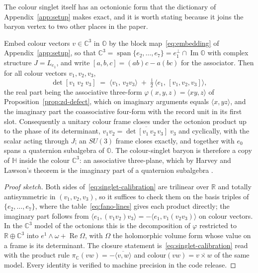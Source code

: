 The colour singlet itself has an octonionic form that the dictionary of Appendix~\ref{app:setup}
makes exact, and it is worth stating because it joins the baryon vertex to two other places in the
paper.

\begin{proposition}\label{prop:singlet-quaternion}
Embed colour vectors $v\in\mathbb{C}^3$ in $\mathbb{O}$ by the block map~\eqref{eq:embedding} of
Appendix~\ref{app:setup}, so that $\mathbb{C}^3 = \operatorname{span}\{e_2,\dots,e_7\} = e_1^{\perp}
\cap \operatorname{Im}\mathbb{O}$ with complex structure $J = L_{e_1}$, and write
$[a,b,c] = (ab)c - a(bc)$ for the associator. Then for all colour vectors $v_1, v_2, v_3$,
\begin{equation}
  \det[v_1\; v_2\; v_3]
  \;=\; \langle v_1,\, v_2 v_3\rangle \;+\; \tfrac{\mathrm{i}}{2}\,\bigl\langle e_1,\,[v_1,v_2,v_3]\bigr\rangle ,
  \label{eq:singlet-calibration}
\end{equation}
the real part being the associative three-form $\varphi(x,y,z) = \langle xy, z\rangle$ of
Proposition~\ref{prop:zd-defect}, which on imaginary arguments equals $\langle x, yz\rangle$, and the
imaginary part the coassociative four-form with the record unit in its first slot. Consequently a
unitary colour frame closes under the octonion product up to the phase of its determinant,
$v_1 v_2 = \overline{\det[v_1\,v_2\,v_3]}\;v_3$ and cyclically, with the scalar acting through $J$;
an $SU(3)$ frame closes exactly, and together with $e_0$ spans a quaternion subalgebra of
$\mathbb{O}$. The colour-singlet baryon is therefore a copy of $\mathbb{H}$ inside the colour
$\mathbb{C}^3$: an associative three-plane, which by Harvey and Lawson's theorem is the imaginary
part of a quaternion subalgebra \autocite{harvey1982calibrated}.
\end{proposition}

\begin{proof}[Proof sketch]
Both sides of~\eqref{eq:singlet-calibration} are trilinear over $\mathbb{R}$ and totally
antisymmetric in $(v_1, v_2, v_3)$, so it suffices to check them on the basis triples of
$\{e_2,\dots,e_7\}$, where the table~\eqref{eq:fano-lines} gives each product directly; the
imaginary part follows from $\langle e_1, (v_1 v_2) v_3\rangle = -\langle e_1, v_1 (v_2 v_3)\rangle$
on colour vectors. In the $\mathbb{C}^3$ model of the octonions this is the decomposition of
$\varphi$ restricted to $\mathbb{R}\oplus\mathbb{C}^3$ into $e^{1}\wedge\omega + \operatorname{Re}
\Omega$, with $\Omega$ the holomorphic volume form whose value on a frame is its determinant. The
closure statement is~\eqref{eq:singlet-calibration} read with the product rule
$\pi_{\mathbb{C}}(vw) = -\overline{\langle v, w\rangle}$ and $\mathrm{colour}(vw) = \overline{v\times w}$
of the same model. Every identity is verified to machine precision in the code release.
\end{proof}

